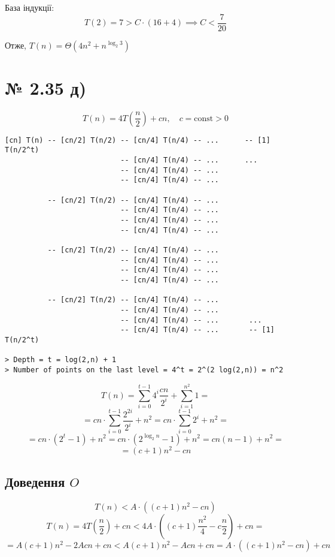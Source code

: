 \documentclass[11pt, a4paper]{article} %
\begin{document}
База індукції:
$$T(2) = 7 > C \cdot (16 + 4) \implies C < \frac{7}{20}$$

\begin{mdframed}[style=ans]
    Отже, $T(n) = \Theta(4n^2 + n^{\log_2 3})$
\end{mdframed} 
\pagebreak

\section*{№ 2.35 д)}
$$T(n) = 4T(\frac{n}{2}) + cn, \quad c=\text{const} >0$$

\begin{lstlisting}
[cn] T(n) -- [cn/2] T(n/2) -- [cn/4] T(n/4) -- ...      -- [1] T(n/2^t) 
                           -- [cn/4] T(n/4) -- ...      ...
                           -- [cn/4] T(n/4) -- ...
                           -- [cn/4] T(n/4) -- ...
                           
          -- [cn/2] T(n/2) -- [cn/4] T(n/4) -- ...
                           -- [cn/4] T(n/4) -- ...
                           -- [cn/4] T(n/4) -- ...
                           -- [cn/4] T(n/4) -- ...
                           
          -- [cn/2] T(n/2) -- [cn/4] T(n/4) -- ...
                           -- [cn/4] T(n/4) -- ...
                           -- [cn/4] T(n/4) -- ...
                           -- [cn/4] T(n/4) -- ...
                           
          -- [cn/2] T(n/2) -- [cn/4] T(n/4) -- ...
                           -- [cn/4] T(n/4) -- ...
                           -- [cn/4] T(n/4) -- ...       ...
                           -- [cn/4] T(n/4) -- ...       -- [1] T(n/2^t) 

> Depth = t = log(2,n) + 1
> Number of points on the last level = 4^t = 2^(2 log(2,n)) = n^2
\end{lstlisting}

$$T(n) = \sum_{i=0}^{t-1} 4^i \frac{cn}{2^i} + \sum_{i=1}^{n^2} 1 = $$
$$= cn \cdot \sum_{i=0}^{t-1}  \frac{2^{2i}}{2^i} + n^2 = cn \cdot \sum_{i=0}^{t-1} 2^i + n^2 = $$
$$= cn \cdot (2^t - 1) + n^2 = cn \cdot (2^{\log_2 n} - 1) + n^2 = cn(n - 1) + n^2 = $$
$$= (c+1)n^2 - cn$$

\subsection*{Доведення $O$}
$$T(n) < A \cdot ((c+1)n^2 - cn)$$
$$T(n) = 4T(\frac{n}{2}) + cn < 4A \cdot ((c+1)\frac{n^2}{4} - c\frac{n}{2}) + cn = $$
$$= A(c+1)n^2 - 2Acn + cn < A(c+1)n^2 - Acn + cn = A\cdot ((c+1)n^2 - cn) + cn$$
\end{document}
